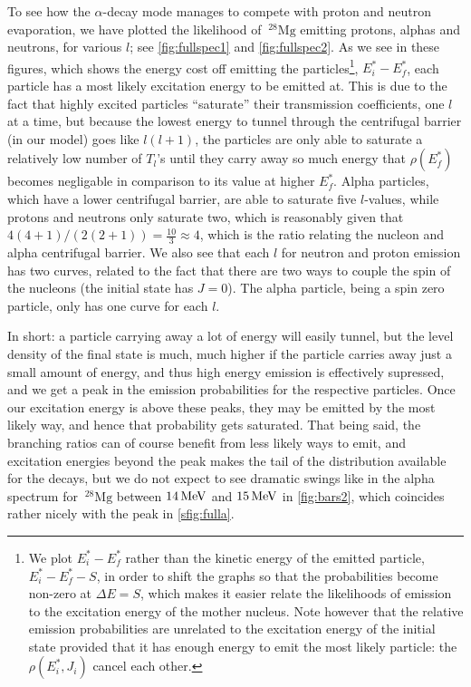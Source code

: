 To see how the $\alpha$-decay mode manages to compete with proton and neutron evaporation, we have plotted the likelihood of $~^{28}\mathrm{Mg}$ emitting protons, alphas and neutrons, for various $l$; see \autoref{fig:fullspec1} and \autoref{fig:fullspec2}. As we see in these figures, which shows the energy cost off emitting the particles\footnote{We plot $E_i^*-E_f^*$ rather than the kinetic energy of the emitted particle, $E_i^*-E_f^*-S$, in order to shift the graphs so that the probabilities become non-zero at $\Delta E = S$, which makes it easier relate the likelihoods of emission to the excitation energy of the mother nucleus. Note however that the relative emission probabilities are unrelated to the excitation energy of the initial state provided that it has enough energy to emit the most likely particle: the $\rho(E_i^*,J_i)$ cancel each other.}, $E_i^*-E_f^*$, each particle has a most likely excitation energy to be emitted at. This is due to the fact that highly excited particles ``saturate'' their transmission coefficients, one $l$ at a time, but because the lowest energy to tunnel through the centrifugal barrier (in our model) goes like $l(l+1)$, the particles are only able to saturate a relatively low number of $T_l$'s until they carry away so much energy that $\rho(E_f^*)$ becomes negligable in comparison to its value at higher $E_f^*$. 
Alpha particles, which have a lower centrifugal barrier, are able to saturate five $l$-values, while protons and neutrons only saturate two, which is reasonably given that $4(4+1)/(2(2+1)) = \frac{10}{3} \approx 4$, which is the ratio relating the nucleon and alpha centrifugal barrier. 
We also see that each $l$ for neutron and proton emission has two curves, related to the fact that there are two ways to couple the spin of the nucleons (the initial state has $J=0$). The alpha particle, being a spin zero particle, only has one curve for each $l$.

In short: a particle carrying away a lot of energy will easily tunnel, but the level density of the final state is much, much higher if the particle carries away just a small amount of energy, and thus high energy emission is effectively supressed, and we get a peak in the emission probabilities for the respective particles. Once our excitation energy is above these peaks, they may be emitted by the most likely way, and hence that probability gets saturated. That being said, the branching ratios can of course benefit from less likely ways to emit, and excitation energies beyond the peak makes the tail of the distribution available for the decays, but we do not expect to see dramatic swings like in the alpha spectrum for $~^{28}\mathrm{Mg}$ between $\unit[14]{MeV}$ and $\unit[15]{MeV}$ in \autoref{fig:bars2}, which coincides rather nicely with the peak in \autoref{sfig:fulla}.


